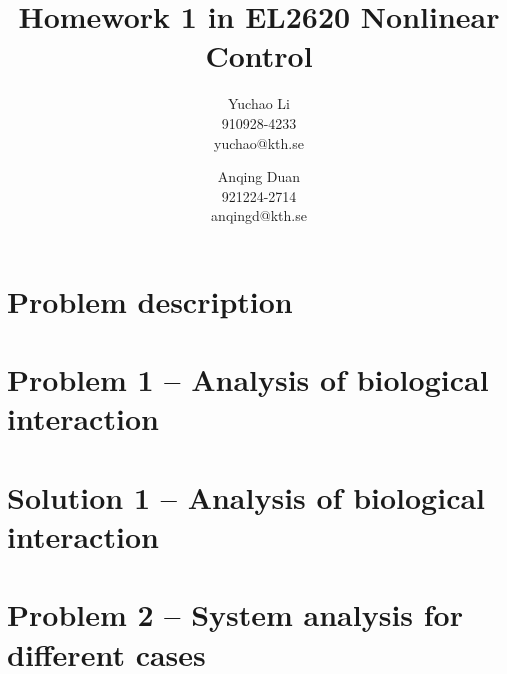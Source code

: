 \documentclass[a4paper,twocolumn]{article} %
\begin{document}

\title{Homework 1 in EL2620 Nonlinear Control}
\author{Yuchao Li \\ 910928-4233 \\ yuchao@kth.se \and Anqing Duan\\
  921224-2714 \\ anqingd@kth.se}

\maketitle                     %





\section*{Problem description}
\label{sec:prob}




\section*{Problem 1 -- Analysis of biological interaction}
\label{sec:pro1}



\section*{Solution 1 -- Analysis of biological interaction}
\label{sec:sol1}



\section*{Problem 2 -- System analysis for different cases}
\label{sec:prob2}


\end{document}
